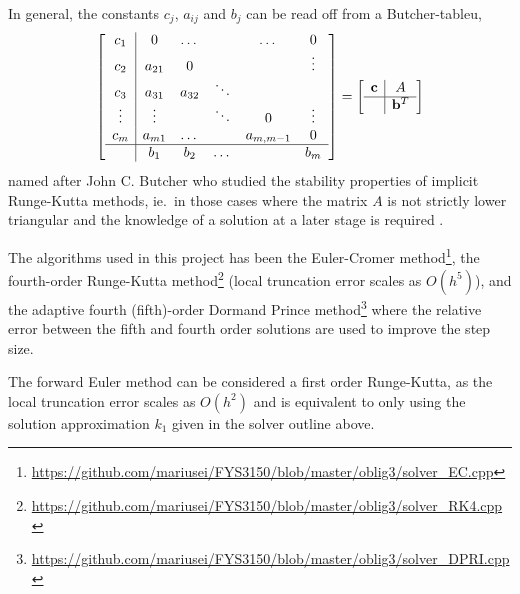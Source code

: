 \documentclass[a4paper,11pt]{article}
\begin{document}
In general, the constants $c_j$, $a_{ij}$ and $b_j$ can be read off from a Butcher-tableu, 
\begin{equation}
    \begin{bmatrix}
        \begin{array}{c | c c c c c}
            c_1     & 0     & \dots&        &\dots& 0 \\
            c_2     & a_{21}&0     &        &   & \vdots \\
            c_3     & a_{31}&a_{32}& \ddots &   & \\
            \vdots  & \vdots&      & \ddots & 0 & \vdots \\
            c_m     & a_{m1}& \dots&        &  a_{m,m-1} & 0 \\
            \hline
                    & b_1   & b_2  & \dots  &         & b_m
        \end{array}
    \end{bmatrix}
    = 
    \begin{bmatrix}
        \begin{array}{c | c}
            \mathbf{c}  &  A \\
            \hline
                        &  \mathbf{b}^T
        \end{array}
    \end{bmatrix}
    \label{eq:butcher}
\end{equation}
named after John C. Butcher who studied the stability properties of implicit Runge-Kutta methods, ie.~in those cases where the matrix $A$ is not strictly lower triangular and the knowledge of a solution at a later stage is required \cite{Butcher:1975}.

The algorithms used in this project has been the Euler-Cromer method\footnote{\url{https://github.com/mariusei/FYS3150/blob/master/oblig3/solver_EC.cpp}}, the fourth-order Runge-Kutta method\footnote{\url{https://github.com/mariusei/FYS3150/blob/master/oblig3/solver_RK4.cpp}} (local truncation error scales as $O(h^5)$), and the adaptive fourth (fifth)-order Dormand Prince method\footnote{\url{https://github.com/mariusei/FYS3150/blob/master/oblig3/solver_DPRI.cpp}} where the relative error between the fifth and fourth order solutions are used to improve the step size.

The forward Euler method can be considered a first order Runge-Kutta, as the local truncation error scales as $O(h^2)$ and is equivalent to only using the solution approximation $k_1$ given in the solver outline above.
\end{document}
